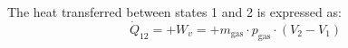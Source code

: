The heat transferred between states 1 and 2 is expressed as:  
\[
\dot{Q}_{12} = +W_v = +m_{\text{gas}} \cdot p_{\text{gas}} \cdot (V_2 - V_1)
\]